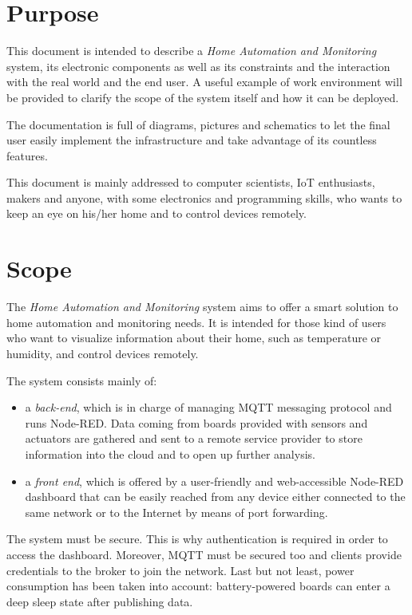 \section{Purpose}
This document is intended to describe a \textit{Home Automation and Monitoring} system, its electronic components as well as its constraints and the interaction with the real world and the end user. A useful example of work environment will be provided to clarify the scope of the system itself and how it can be deployed.

The documentation is full of diagrams, pictures and schematics to let the final user easily implement the infrastructure and take advantage of its countless features.

This document is mainly addressed to computer scientists, IoT enthusiasts, makers and anyone, with some electronics and programming skills, who wants to keep an eye on his/her home and to control devices remotely.

\section{Scope}
The \textit{Home Automation and Monitoring} system aims to offer a smart solution to home automation and monitoring needs. It is intended for those kind of users who want to visualize information about their home, such as temperature or humidity, and control devices remotely.

The system consists mainly of:
\begin{itemize}
	\item a \textit{back-end}, which is in charge of managing MQTT messaging protocol and runs Node-RED. Data coming from boards provided with sensors and actuators are gathered and sent to a remote service provider to store information into the cloud and to open up further analysis.
	
	\item a \textit{front end}, which is offered by a user-friendly and web-accessible Node-RED dashboard that can be easily reached from any device either connected to the same network or to the Internet by means of port forwarding.
\end{itemize}

\noindent
The system must be secure. This is why authentication is required in order to access the dashboard.
Moreover, MQTT must be secured too and clients provide credentials to the broker to join the network.
Last but not least, power consumption has been taken into account: battery-powered boards can enter a deep sleep state after publishing data.

